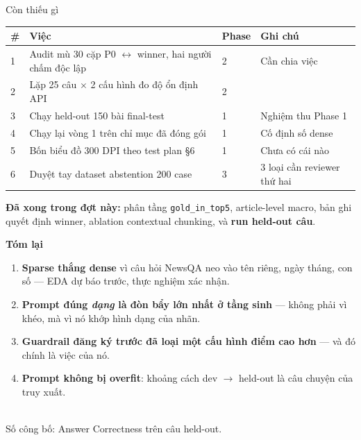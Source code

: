 \begin{frame}[shrink=20]{Còn thiếu gì}
  \small
  \begin{tabularx}{\textwidth}{@{}p{0.6cm} L p{1.2cm} p{2.6cm}@{}}
    \toprule
    \textbf{\#} & \textbf{Việc} & \textbf{Phase} & \textbf{Ghi chú} \\
     & Audit mù 30 cặp P0 $\leftrightarrow$ winner, hai người chấm độc lập & 2 & Cần chia việc \\
    2 & Lặp 25 câu $\times$ 2 cấu hình đo độ ổn định API & 2 & \\
    3 & Chạy held-out 150 bài final-test & 1 & Nghiệm thu Phase 1 \\
    4 & Chạy lại vòng 1 trên chỉ mục đã đóng gói & 1 & Cố định số dense \\
    5 & Bốn biểu đồ 300 DPI theo test plan §6 & 1 & Chưa có cái nào \\
    6 & Duyệt tay dataset abstention 200 case & 3 & 3 loại cần reviewer thứ hai \\
    \bottomrule
  \end{tabularx}

  \vspace{0.8em}
  \textbf{Đã xong trong đợt này:} phân tầng \texttt{gold\_in\_top5}, article-level
  macro, bản ghi quyết định winner, ablation contextual chunking, và
  \textbf{run held-out \NumNHeldout{} câu}.

\end{frame}

\begin{frame}[plain]
  \vfill
  \begin{center}
    {\Large\textbf{Tóm lại}}\\[1.2em]
    \begin{minipage}{0.86\textwidth}\small
      \begin{enumerate}
        \item \textbf{Sparse thắng dense} vì câu hỏi NewsQA neo vào tên riêng,
              ngày tháng, con số --- EDA dự báo trước, thực nghiệm xác nhận.
        \item \textbf{Prompt đúng \emph{dạng} là đòn bẩy lớn nhất ở tầng sinh}
              --- không phải vì khéo, mà vì nó khớp hình dạng của nhãn.
        \item \textbf{Guardrail đăng ký trước đã loại một cấu hình điểm cao hơn}
              --- và đó chính là việc của nó.
        \item \textbf{Prompt không bị overfit}: khoảng cách dev $\rightarrow$
              held-out là câu chuyện của truy xuất.
      \end{enumerate}
    \end{minipage}
    \\[1.5em]
    {\small\color{brandmuted}
     Số công bố: Answer Correctness \textbf{\NumHoAC{}} trên \NumNHeldout{} câu held-out.}
  \end{center}
  \vfill
\end{frame}
